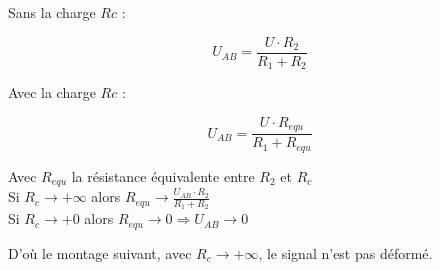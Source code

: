 

\begin{reponse}

Sans la charge $Rc$ : 

$$ U_{AB}= \frac{U \cdot R_2}{R_1+R_2}$$

Avec  la charge $Rc$ :

$$ U_{AB}= \frac{U \cdot R_{equ}}{R_1+R_{equ}}$$


Avec $R_{equ}$ la résistance équivalente entre $R_2$ et $R_c$ \\



Si $R_c \rightarrow + \infty$ alors $R_{equ} \rightarrow \frac{U_{AB} \cdot R_2}{R_1+R_2}$ \\

Si $R_c \rightarrow + 0 $ alors $R_{equ} \rightarrow 0 \Rightarrow U_{AB} \rightarrow 0$

\end{reponse}


D'où le montage suivant, avec $R_c \rightarrow + \infty$, le signal n'est pas déformé.



